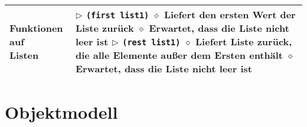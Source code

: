 \begin{tabular}{ | p{} p{} | }
    \makecell[l]{Funktionen auf \\ Listen} & \makecell[l]{
    $\triangleright$ \texttt{(first list1)} \\
    \hspace{0.4cm} $\diamond$ Liefert den ersten Wert der Liste zurück \\
    \hspace{0.4cm} $\diamond$ Erwartet, dass die Liste nicht leer ist \\
    $\triangleright$ \texttt{(rest list1)} \\
    \hspace{0.4cm} $\diamond$ Liefert Liste zurück, die alle Elemente au\ss er dem Ersten enthält \\
    \hspace{0.4cm} $\diamond$ Erwartet, dass die Liste nicht leer ist} \\ \hline

    \end{tabular}

\section{Objektmodell}

